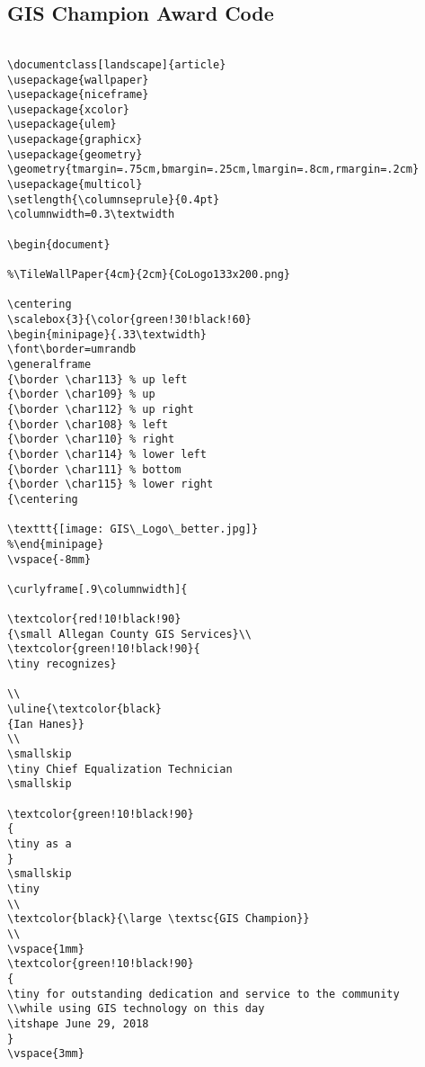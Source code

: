 \documentclass[class=book , crop=false]{standalone}
\title{}  %
\begin{document}

\ifstandalone
\maketitle %
\tableofcontents %
\clearpage
\fi

\subsection{GIS Champion Award Code}

\begin{verbatim}

\documentclass[landscape]{article}
\usepackage{wallpaper}
\usepackage{niceframe}
\usepackage{xcolor}
\usepackage{ulem}
\usepackage{graphicx}
\usepackage{geometry}
\geometry{tmargin=.75cm,bmargin=.25cm,lmargin=.8cm,rmargin=.2cm}
\usepackage{multicol}
\setlength{\columnseprule}{0.4pt}
\columnwidth=0.3\textwidth

\begin{document}

%\TileWallPaper{4cm}{2cm}{CoLogo133x200.png}

\centering
\scalebox{3}{\color{green!30!black!60}
\begin{minipage}{.33\textwidth}
\font\border=umrandb
\generalframe
{\border \char113} % up left
{\border \char109} % up
{\border \char112} % up right
{\border \char108} % left
{\border \char110} % right
{\border \char114} % lower left
{\border \char111} % bottom
{\border \char115} % lower right
{\centering

\texttt{[image: GIS\_Logo\_better.jpg]}
%\end{minipage}
\vspace{-8mm}

\curlyframe[.9\columnwidth]{

\textcolor{red!10!black!90}
{\small Allegan County GIS Services}\\
\textcolor{green!10!black!90}{
\tiny recognizes}

\\
\uline{\textcolor{black}
{Ian Hanes}}
\\
\smallskip
\tiny Chief Equalization Technician
\smallskip

\textcolor{green!10!black!90}
{
\tiny as a
}
\smallskip
\tiny
\\
\textcolor{black}{\large \textsc{GIS Champion}}
\\
\vspace{1mm}
\textcolor{green!10!black!90}
{
\tiny for outstanding dedication and service to the community
\\while using GIS technology on this day
\itshape June 29, 2018
}
\vspace{3mm}


\end{verbatim}
\end{document}
